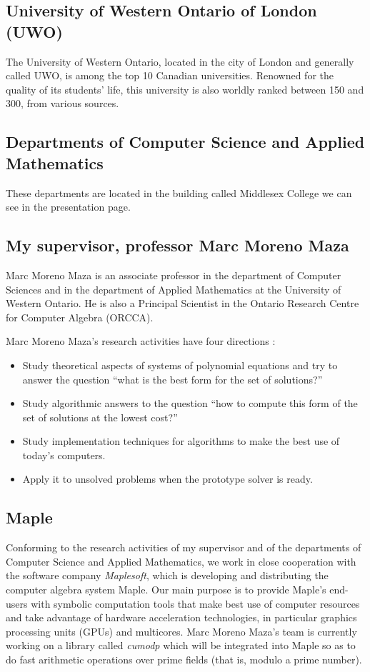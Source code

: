 \subsection{University of Western Ontario of London (UWO)}

The University of Western Ontario, located in the city of London and generally called UWO, is among the top 10 Canadian universities.
Renowned for the quality of its students' life,
this university is also worldly ranked between 150 and 300,
from various sources.

\subsection{Departments of Computer Science and Applied Mathematics}
These departments are located in the building called Middlesex College we can see in the presentation page.

\subsection{My supervisor, professor Marc Moreno Maza}

Marc Moreno Maza is an associate professor in the department of Computer Sciences and in the department of Applied Mathematics at the University of Western Ontario. He is also a Principal Scientist in the Ontario Research Centre for Computer Algebra (ORCCA).

Marc Moreno Maza's research activities have four directions :
\begin{itemize}
\item[\textbullet] Study theoretical aspects of systems of polynomial equations and try to answer the question ``what is the best form for the set of solutions?''
\item[\textbullet] Study algorithmic answers to the question ``how to compute this form of the set of solutions at the lowest cost?''
\item[\textbullet] Study implementation techniques for algorithms to make the best use of today's computers.
\item[\textbullet] Apply it to unsolved problems when the prototype solver is ready.
\end{itemize}

\subsection{Maple}

Conforming to the research activities of my supervisor and of the departments of Computer Science and Applied Mathematics, we work in close cooperation with the software company {\it Maplesoft}, which is developing and distributing the computer algebra system {\sc Maple}. Our main purpose is to provide {\sc Maple}'s end-users with symbolic computation tools 
that make best use of computer resources and take advantage of hardware acceleration technologies, in particular graphics processing units (GPUs) and multicores. Marc Moreno Maza's team is currently working on a library called \textit{cumodp} which will be integrated into {\sc Maple} so as to do fast arithmetic operations over prime fields (that is, modulo a prime number).


